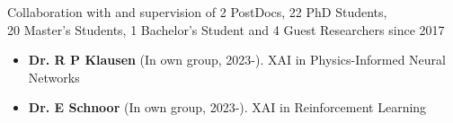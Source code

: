 
\newcommand{\supervision}[3]{\textbf{#1} (In own group, #2). {\small #3}}
\newcommand{\cosupervision}[4]{\textbf{#1} (#2, #3, co-supervision). {\small #4}}

\ifdefined\shortcv
    {
        \hspace*{\fill} Collaboration with and supervision of 2 PostDocs, 22 PhD Students,\\
        \hspace*{\fill} 20 Master's Students, 1 Bachelor's Student and 4 Guest Researchers since 2017
        }
\else
        {
            \begin{itemize}
                \item [] \supervision{Dr. R P Klausen}{2023-}{XAI in Physics-Informed Neural Networks}
                \item [] \supervision{Dr. E Schnoor}{2023-}{XAI in Reinforcement Learning}
            \end{itemize}
        }

